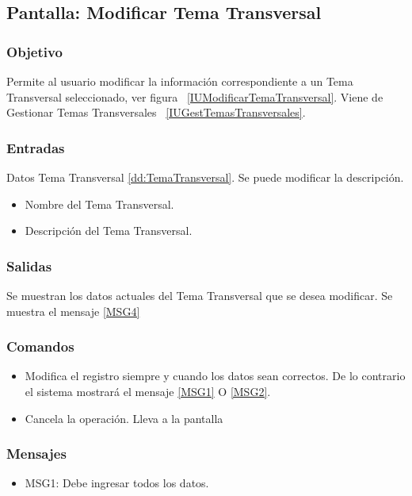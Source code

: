 \subsection{Pantalla: Modificar Tema Transversal}

\subsubsection{Objetivo}
Permite al usuario modificar la información correspondiente a un Tema Transversal seleccionado, ver figura ~\ref{IUModificarTemaTransversal}. Viene de Gestionar Temas Transversales ~\ref{IUGestTemasTransversales}.


\subsubsection{Entradas}
Datos Tema Transversal \ref{dd:TemaTransversal}. Se puede modificar la descripción.
\begin{itemize}
\item Nombre del Tema Transversal.
\item Descripción del Tema Transversal.
\end{itemize}

\subsubsection{Salidas}
Se muestran los datos actuales del Tema Transversal que se desea modificar.
Se muestra el mensaje \ref{MSG4}

\subsubsection{Comandos}
\begin{itemize}
 \item {} Modifica el registro siempre y cuando los datos sean correctos. De lo contrario el sistema mostrará el mensaje \ref{MSG1} O \ref{MSG2}.
 \item {} Cancela la operación. Lleva a la pantalla 

\end{itemize}

\subsubsection{Mensajes}
\begin{itemize}
 \item MSG1: Debe ingresar todos los datos.
\end{itemize}